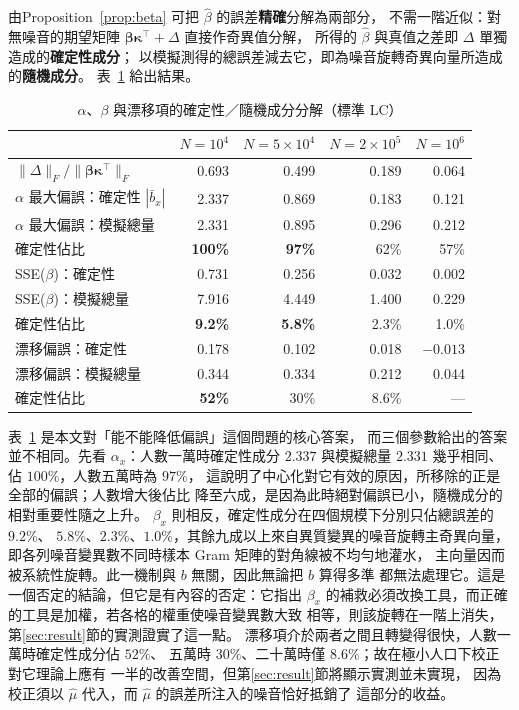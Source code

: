 \documentclass[UTF8, fontset=macnew, a4paper, 12pt]{ctexart}
\begin{document}
由Proposition~\ref{prop:beta} 可把 $\hat\beta$ 的誤差\textbf{精確}分解為兩部分，
不需一階近似：對無噪音的期望矩陣
$\boldsymbol\beta\boldsymbol\kappa^{\top}+\Delta$ 直接作奇異值分解，
所得的 $\hat\beta$ 與真值之差即 $\Delta$ 單獨造成的\textbf{確定性成分}；
以模擬測得的總誤差減去它，即為噪音旋轉奇異向量所造成的\textbf{隨機成分}。
表~\ref{tab:betadec} 給出結果。

\begin{table}[H]
\centering
\caption{$\alpha$、$\beta$ 與漂移項的確定性／隨機成分分解（標準 LC）}
\small
\begin{tabular}{lrrrr}
\toprule
 & $N=10^4$ & $N=5\times10^4$ & $N=2\times10^5$ & $N=10^6$\\
\midrule
$\|\Delta\|_F/\|\boldsymbol\beta\boldsymbol\kappa^{\top}\|_F$
 & 0.693 & 0.499 & 0.189 & 0.064\\
\midrule
$\alpha$ 最大偏誤：確定性 $|\bar b_x|$ & 2.337 & 0.869 & 0.183 & 0.121\\
$\alpha$ 最大偏誤：模擬總量 & 2.331 & 0.895 & 0.296 & 0.212\\
\quad 確定性佔比 & \textbf{100\%} & \textbf{97\%} & 62\% & 57\%\\
\midrule
SSE($\beta$)：確定性 & 0.731 & 0.256 & 0.032 & 0.002\\
SSE($\beta$)：模擬總量 & 7.916 & 4.449 & 1.400 & 0.229\\
\quad 確定性佔比 & \textbf{9.2\%} & \textbf{5.8\%} & 2.3\% & 1.0\%\\
\midrule
漂移偏誤：確定性 & 0.178 & 0.102 & 0.018 & $-0.013$\\
漂移偏誤：模擬總量 & 0.344 & 0.334 & 0.212 & 0.044\\
\quad 確定性佔比 & \textbf{52\%} & 30\% & 8.6\% & ---\\
\bottomrule
\end{tabular}
\label{tab:betadec}
\end{table}

表~\ref{tab:betadec} 是本文對「能不能降低偏誤」這個問題的核心答案，
而三個參數給出的答案並不相同。先看 $\alpha_x$：人數一萬時確定性成分
$2.337$ 與模擬總量 $2.331$ 幾乎相同、佔 $100\%$，人數五萬時為 $97\%$，
這說明了中心化對它有效的原因，所移除的正是全部的偏誤；人數增大後佔比
降至六成，是因為此時絕對偏誤已小，隨機成分的相對重要性隨之上升。
$\beta_x$ 則相反，確定性成分在四個規模下分別只佔總誤差的 $9.2\%$、
$5.8\%$、$2.3\%$、$1.0\%$，其餘九成以上來自異質變異的噪音旋轉主奇異向量，
即各列噪音變異數不同時樣本 Gram 矩陣的對角線被不均勻地灌水，
主向量因而被系統性旋轉。此一機制與 $b$ 無關，因此無論把 $b$ 算得多準
都無法處理它。這是一個否定的結論，但它是有內容的否定：它指出 $\beta_x$
的補救必須改換工具，而正確的工具是加權，若各格的權重使噪音變異數大致
相等，則該旋轉在一階上消失，第\ref{sec:result}節的實測證實了這一點。
漂移項介於兩者之間且轉變得很快，人數一萬時確定性成分佔 $52\%$、
五萬時 $30\%$、二十萬時僅 $8.6\%$；故在極小人口下校正對它理論上應有
一半的改善空間，但第\ref{sec:result}節將顯示實測並未實現，
因為校正須以 $\hat\mu$ 代入，而 $\hat\mu$ 的誤差所注入的噪音恰好抵銷了
這部分的收益。
\end{document}
